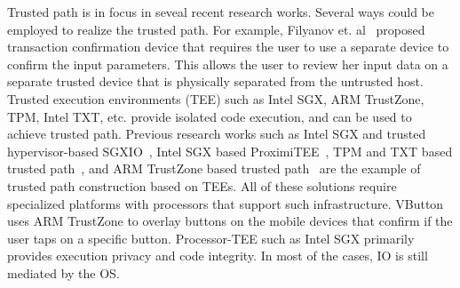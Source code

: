 
Trusted path is in focus in seveal recent research works. Several ways could be employed to realize the trusted path. For example, Filyanov et. al~\cite{filyanov2011uni} proposed transaction confirmation device that requires the user to use a separate device to confirm the input parameters. This allows the user to review her input data on a separate trusted device that is physically separated from the untrusted host. Trusted execution environments (TEE) such as Intel SGX, ARM TrustZone, TPM, Intel TXT, etc. provide isolated code execution, and can be used to achieve trusted path. Previous research works such as Intel SGX and trusted hypervisor-based SGXIO~\cite{weiser2017sgxio}, Intel SGX based ProximiTEE~\cite{dhar2018proximitee}, TPM and TXT based trusted path~\cite{filyanov2011uni}, and ARM TrustZone based trusted path~\cite{sun2015trustotp} are the example of trusted path construction based on TEEs. All of these solutions require specialized platforms with processors that support such infrastructure. VButton~\cite{li2018vbutton} uses ARM TrustZone to overlay buttons on the mobile devices that confirm if the user taps on a specific button. Processor-TEE such as Intel SGX primarily provides execution privacy and code integrity. In most of the cases, IO is still mediated by the OS. 


